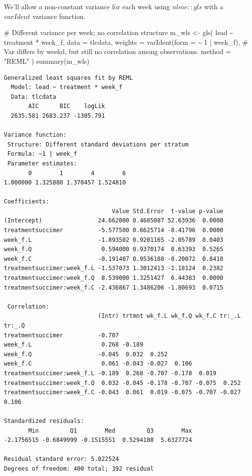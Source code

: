 \documentclass[
  letterpaper,
  DIV=11,
  numbers=noendperiod]{scrreprt}
\newenvironment{Shaded}{\begin{snugshade}}{\end{snugshade}}
\newcommand{\AttributeTok}[1]{\textcolor[rgb]{0.40,0.45,0.13}{#1}}
\newcommand{\CommentTok}[1]{\textcolor[rgb]{0.37,0.37,0.37}{#1}}
\newcommand{\DecValTok}[1]{\textcolor[rgb]{0.68,0.00,0.00}{#1}}
\newcommand{\FunctionTok}[1]{\textcolor[rgb]{0.28,0.35,0.67}{#1}}
\newcommand{\NormalTok}[1]{\textcolor[rgb]{0.00,0.23,0.31}{#1}}
\newcommand{\OtherTok}[1]{\textcolor[rgb]{0.00,0.23,0.31}{#1}}
\newcommand{\SpecialCharTok}[1]{\textcolor[rgb]{0.37,0.37,0.37}{#1}}
\newcommand{\StringTok}[1]{\textcolor[rgb]{0.13,0.47,0.30}{#1}}
\begin{document}
We'll allow a non-constant variance for each week using \(nlme::gls\)
with a \(varIdent\) variance function.

\begin{Shaded}
\begin{Highlighting}[]
\CommentTok{\# Different variance per week; no correlation structure}
\NormalTok{m\_wls }\OtherTok{\textless{}{-}} \FunctionTok{gls}\NormalTok{(}
\NormalTok{  lead }\SpecialCharTok{\textasciitilde{}}\NormalTok{ treatment }\SpecialCharTok{*}\NormalTok{ week\_f,}
  \AttributeTok{data =}\NormalTok{ tlcdata,}
  \AttributeTok{weights =} \FunctionTok{varIdent}\NormalTok{(}\AttributeTok{form =} \SpecialCharTok{\textasciitilde{}} \DecValTok{1} \SpecialCharTok{|}\NormalTok{ week\_f),  }\CommentTok{\# Var differs by weekd, but still no correlation among observations.}
  \AttributeTok{method =} \StringTok{"REML"}
\NormalTok{)}
\FunctionTok{summary}\NormalTok{(m\_wls)}
\end{Highlighting}
\end{Shaded}

\begin{verbatim}
Generalized least squares fit by REML
  Model: lead ~ treatment * week_f 
  Data: tlcdata 
       AIC      BIC    logLik
  2635.581 2683.237 -1305.791

Variance function:
 Structure: Different standard deviations per stratum
 Formula: ~1 | week_f 
 Parameter estimates:
       0        1        4        6 
1.000000 1.325880 1.370457 1.524810 

Coefficients:
                               Value Std.Error  t-value p-value
(Intercept)                24.662000 0.4685087 52.63936  0.0000
treatmentsuccimer          -5.577500 0.6625714 -8.41796  0.0000
week_f.L                   -1.893502 0.9201165 -2.05789  0.0403
week_f.Q                    0.594000 0.9370174  0.63393  0.5265
week_f.C                   -0.191407 0.9536188 -0.20072  0.8410
treatmentsuccimer:week_f.L -1.537073 1.3012413 -1.18124  0.2382
treatmentsuccimer:week_f.Q  8.539000 1.3251427  6.44383  0.0000
treatmentsuccimer:week_f.C -2.436867 1.3486206 -1.80693  0.0715

 Correlation: 
                           (Intr) trtmnt wk_f.L wk_f.Q wk_f.C tr:_.L tr:_.Q
treatmentsuccimer          -0.707                                          
week_f.L                    0.268 -0.189                                   
week_f.Q                   -0.045  0.032  0.252                            
week_f.C                    0.061 -0.043 -0.027  0.106                     
treatmentsuccimer:week_f.L -0.189  0.268 -0.707 -0.178  0.019              
treatmentsuccimer:week_f.Q  0.032 -0.045 -0.178 -0.707 -0.075  0.252       
treatmentsuccimer:week_f.C -0.043  0.061  0.019 -0.075 -0.707 -0.027  0.106

Standardized residuals:
       Min         Q1        Med         Q3        Max 
-2.1756515 -0.6849999 -0.1515551  0.5294188  5.6327724 

Residual standard error: 5.022524 
Degrees of freedom: 400 total; 392 residual
\end{verbatim}
\end{document}
